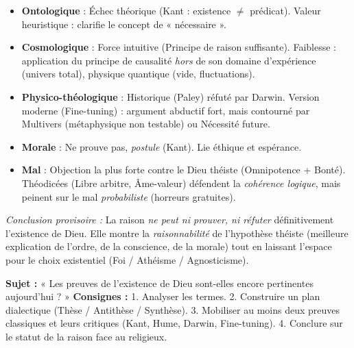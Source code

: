 \documentclass[11pt]{article}
\begin{document}
\begin{aretenir}
\begin{itemize}
    \item \textbf{Ontologique} : Échec théorique (Kant : existence $\neq$ prédicat). Valeur heuristique : clarifie le concept de « nécessaire ».
    \item \textbf{Cosmologique} : Force intuitive (Principe de raison suffisante). Faiblesse : application du principe de causalité \emph{hors} de son domaine d'expérience (univers total), physique quantique (vide, fluctuations).
    \item \textbf{Physico-théologique} : Historique (Paley) réfuté par Darwin. Version moderne (Fine-tuning) : argument abductif fort, mais contourné par Multivers (métaphysique non testable) ou Nécessité future.
    \item \textbf{Morale} : Ne prouve pas, \emph{postule} (Kant). Lie éthique et espérance.
    \item \textbf{Mal} : Objection la plus forte contre le Dieu théiste (Omnipotence + Bonté). Théodicées (Libre arbitre, Âme-valeur) défendent la \emph{cohérence logique}, mais peinent sur le mal \emph{probabiliste} (horreurs gratuites).
\end{itemize}
\emph{Conclusion provisoire :} La raison \emph{ne peut ni prouver, ni réfuter} définitivement l'existence de Dieu. Elle montre la \emph{raisonnabilité} de l'hypothèse théiste (meilleure explication de l'ordre, de la conscience, de la morale) tout en laissant l'espace pour le choix existentiel (Foi / Athéisme / Agnosticisme).
\end{aretenir}

\begin{exercice}
\textbf{Sujet :} « Les preuves de l'existence de Dieu sont-elles encore pertinentes aujourd'hui ? »
\textbf{Consignes :} 1. Analyser les termes. 2. Construire un plan dialectique (Thèse / Antithèse / Synthèse). 3. Mobiliser au moins deux preuves classiques et leurs critiques (Kant, Hume, Darwin, Fine-tuning). 4. Conclure sur le statut de la raison face au religieux.
\end{exercice}
\end{document}
